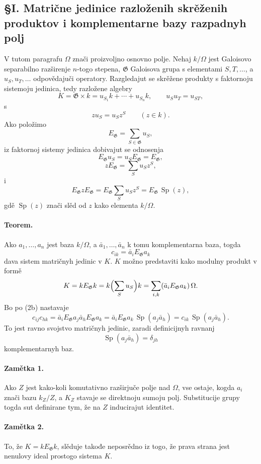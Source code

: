 \documentclass[11pt]{article}
\providecommand{\Sp}{\operatorname{Sp}}
\providecommand{\Gg}{\mathfrak G}
\begin{document}
\subsection*{§I. Matrične jedinice razloženih skrěženih produktov i komplementarne bazy razpadnyh polj}

V tutom paragrafu \(\Omega\) znači proizvoljno osnovno polje. Nehaj \(k/\Omega\) jest Galoisovo separabilno razširenje \(n\)-togo stepena, \(\Gg\) Galoisova grupa s elementami \(S,T,\ldots\), a \(u_S,u_T,\ldots\) odpovědajuči operatory. Razgledajut se skrěžene produkty s faktornoju sistemoju jedinica, tedy razložene algebry
\[
        K=\Gg\times k=u_{S_1}k+\cdots+u_{S_n}k,\qquad
        u_Su_T=u_{ST},
\]
s
\[
        z u_S=u_S z^S \qquad(z\in k).
\]
Ako položimo
\[
        E_\Gg=\sum_{S\in\Gg}u_S,
\]
iz faktornoj sistemy jedinica dobivajut se odnosenja
\[
        E_\Gg u_S=u_S E_\Gg=E_\Gg,                            \tag{1}
\]
\[
        zE_\Gg=\sum_Su_Sz^S,                                  \tag{2a}
\]
i
\[
        E_\Gg z E_\Gg
        =E_\Gg\sum_Su_Sz^S
        =E_\Gg\,\Sp(z),                                      \tag{2b}
\]
gdě \(\Sp(z)\) znači slěd od \(z\) kako elementa \(k/\Omega\).

\paragraph{Teorem.}
Ako \(a_1,\ldots,a_n\) jest baza \(k/\Omega\), a \(\bar a_1,\ldots,\bar a_n\) k tomu komplementarna baza, togda
\[
        c_{ik}=\bar a_iE_\Gg a_k
\]
dava sistem matričnyh jedinic v \(K\). \(K\) možno predstaviti kako modulny produkt v formě
\[
        K=kE_\Gg k
          =k\Bigl(\sum_Su_S\Bigr)k
          =\sum_{i,k}(\bar a_iE_\Gg a_k)\,\Omega .
\]
Bo po (2b) nastavaje
\[
        c_{ij}c_{hk}
        =\bar a_iE_\Gg a_j\bar a_hE_\Gg a_k
        =\bar a_iE_\Gg a_k\,\Sp(a_j\bar a_h)
        =c_{ik}\,\Sp(a_j\bar a_h).
\]
To jest ravno svojstvo matričnyh jedinic, zaradi definicijnyh ravnanj
\[
        \Sp(a_j\bar a_h)=\delta_{jh}
\]
komplementarnyh baz.

\paragraph{Zamětka 1.}
Ako \(Z\) jest kako-koli komutativno razširjuče polje nad \(\Omega\), vse ostaje, kogda \(a_i\) znači bazu \(k_Z/Z\), a \(K_Z\) stavaje se direktnoju sumoju polj. Substitucije grupy togda sut definirane tym, že na \(Z\) inducirajut identitet.

\paragraph{Zamětka 2.}
To, že \(K=kE_\Gg k\), slěduje takođe neposrědno iz togo, že prava strana jest nenulovy ideal prostogo sistema \(K\).
\end{document}
